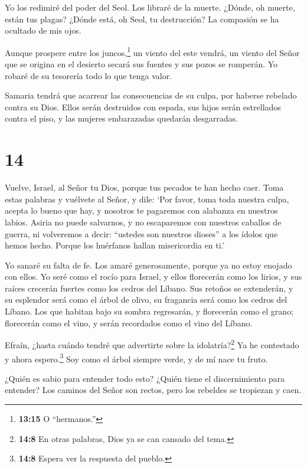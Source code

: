  Yo los redimiré del poder del Seol. Los libraré de la
muerte. ¿Dónde, oh muerte, están tus plagas? ¿Dónde está, oh Seol, tu
destrucción? La compasión se ha ocultado de mis ojos.

 Aunque prospere entre los juncos,\footnote{\textbf{13:15}
  O ``hermanos.''} un viento del este vendrá, un viento del Señor que se
origina en el desierto secará sus fuentes y sus pozos se romperán. Yo
robaré de su tesorería todo lo que tenga valor.

 Samaria tendrá que acarrear las consecuencias de su culpa,
por haberse rebelado contra su Dios. Ellos serán destruidos con espada,
sus hijos serán estrellados contra el piso, y las mujeres embarazadas
quedarán desgarradas.

\hypertarget{section-13}{%
\section{14}\label{section-13}}

 Vuelve, Israel, al Señor tu Dios, porque tus pecados te han
hecho caer.  Toma estas palabras y vuélvete al Señor, y
dile: `Por favor, toma toda nuestra culpa, acepta lo bueno que hay, y
nosotros te pagaremos con alabanza en nuestros labios. 
Asiria no puede salvarnos, y no escaparemos con nuestros caballos de
guerra, ni volveremos a decir: ``ustedes son nuestros dioses'' a los
ídolos que hemos hecho. Porque los huérfanos hallan misericordia en ti.'

 Yo sanaré su falta de fe. Los amaré generosamente, porque
ya no estoy enojado con ellos.  Yo seré como el rocío para
Israel, y ellos florecerán como los lirios, y sus raíces crecerán
fuertes como los cedros del Líbano.  Sus retoños se
extenderán, y su esplendor será como el árbol de olivo, su fragancia
será como los cedros del Líbano.  Los que habitan bajo su
sombra regresarán, y florecerán como el grano; florecerán como el vino,
y serán recordados como el vino del Líbano.

 Efraín, ¿hasta cuándo tendré que advertirte sobre la
idolatría?\footnote{\textbf{14:8} En otras palabras, Dios ya se can
  cansado del tema.} Ya he contestado y ahora espero.\footnote{\textbf{14:8}
  Espera ver la respuesta del pueblo.} Soy como el árbol siempre verde,
y de mí nace tu fruto.

 ¿Quién es sabio para entender todo esto? ¿Quién tiene el
discernimiento para entender? Los caminos del Señor son rectos, pero los
rebeldes se tropiezan y caen.
